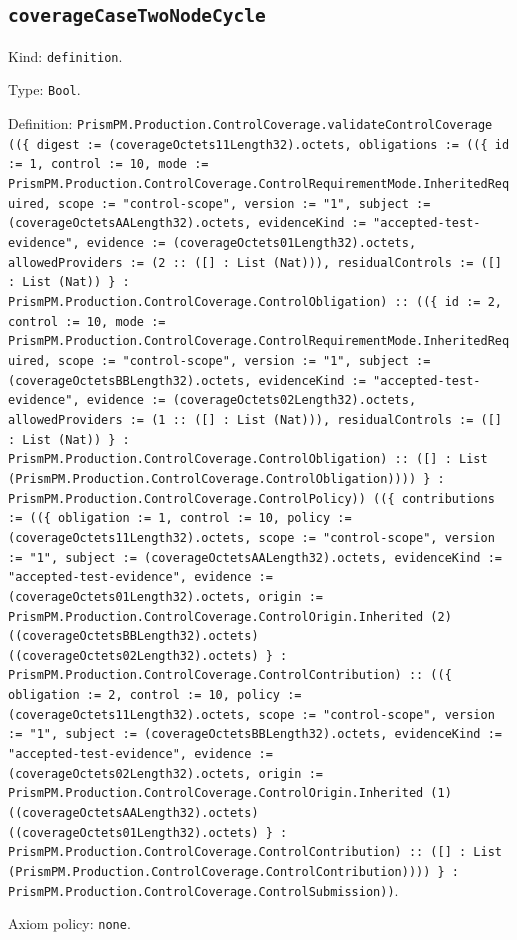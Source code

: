 \documentclass[11pt]{article}
\begin{document}
\subsection*{\texttt{coverageCaseTwoNodeCycle}}
\noindent Kind: \texttt{definition}.\par
\noindent Type: \texttt{Bool}.\par
\noindent Definition: \texttt{PrismPM.Production.ControlCoverage.validateControlCoverage ((\{ digest := (coverageOctets11Length32).octets, obligations := ((\{ id := 1, control := 10, mode := PrismPM.Production.ControlCoverage.ControlRequirementMode.InheritedRequired, scope := "control-scope", version := "1", subject := (coverageOctetsAALength32).octets, evidenceKind := "accepted-test-evidence", evidence := (coverageOctets01Length32).octets, allowedProviders := (2 :: ([] : List (Nat))), residualControls := ([] : List (Nat)) \} : PrismPM.Production.ControlCoverage.ControlObligation) :: ((\{ id := 2, control := 10, mode := PrismPM.Production.ControlCoverage.ControlRequirementMode.InheritedRequired, scope := "control-scope", version := "1", subject := (coverageOctetsBBLength32).octets, evidenceKind := "accepted-test-evidence", evidence := (coverageOctets02Length32).octets, allowedProviders := (1 :: ([] : List (Nat))), residualControls := ([] : List (Nat)) \} : PrismPM.Production.ControlCoverage.ControlObligation) :: ([] : List (PrismPM.Production.ControlCoverage.ControlObligation)))) \} : PrismPM.Production.ControlCoverage.ControlPolicy)) ((\{ contributions := ((\{ obligation := 1, control := 10, policy := (coverageOctets11Length32).octets, scope := "control-scope", version := "1", subject := (coverageOctetsAALength32).octets, evidenceKind := "accepted-test-evidence", evidence := (coverageOctets01Length32).octets, origin := PrismPM.Production.ControlCoverage.ControlOrigin.Inherited (2) ((coverageOctetsBBLength32).octets) ((coverageOctets02Length32).octets) \} : PrismPM.Production.ControlCoverage.ControlContribution) :: ((\{ obligation := 2, control := 10, policy := (coverageOctets11Length32).octets, scope := "control-scope", version := "1", subject := (coverageOctetsBBLength32).octets, evidenceKind := "accepted-test-evidence", evidence := (coverageOctets02Length32).octets, origin := PrismPM.Production.ControlCoverage.ControlOrigin.Inherited (1) ((coverageOctetsAALength32).octets) ((coverageOctets01Length32).octets) \} : PrismPM.Production.ControlCoverage.ControlContribution) :: ([] : List (PrismPM.Production.ControlCoverage.ControlContribution)))) \} : PrismPM.Production.ControlCoverage.ControlSubmission))}.\par
\noindent Axiom policy: \texttt{none}.\par
\end{document}
